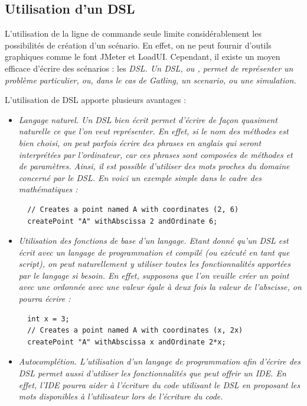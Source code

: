\subsection{Utilisation d'un DSL}
L'utilisation de la ligne de commande seule limite considérablement les possibilités de création d'un scénario. En effet, on ne peut fournir d'outils graphiques comme le font JMeter et LoadUI. Cependant, il existe un moyen efficace d'écrire des scénarios : les \em{DSL}. Un DSL, ou , permet de représenter un problème particulier, ou, dans le cas de Gatling, un scenario, ou une simulation.

L'utilisation de DSL apporte plusieurs avantages :
\begin{itemize}
  \item \em{Langage naturel}. Un DSL bien écrit permet d'écrire de façon quasiment naturelle ce que l'on veut représenter. En effet, si le nom des méthodes est bien choisi, on peut parfois écrire des phrases en anglais qui seront interprétées par l'ordinateur, car ces phrases sont composées de méthodes et de paramètres. Ainsi, il est possible d'utiliser des mots proches du domaine concerné par le DSL. En voici un exemple simple dans le cadre des mathématiques :
  \begin{lstlisting}
  // Creates a point named A with coordinates (2, 6)
  createPoint "A" withAbscissa 2 andOrdinate 6;
  \end{lstlisting}
  \item \em{Utilisation des fonctions de base d'un langage}. Etant donné qu'un DSL est écrit avec un langage de programmation et compilé (ou exécuté en tant que script), on peut naturellement y utiliser toutes les fonctionnalités apportées par le langage si besoin. En effet, supposons que l'on veuille créer un point avec une ordonnée avec une valeur égale à deux fois la valeur de l'abscisse, on pourra écrire :
  \begin{lstlisting}
  int x = 3;
  // Creates a point named A with coordinates (x, 2x)
  createPoint "A" withAbscissa x andOrdinate 2*x;
  \end{lstlisting}
  \item \em{Autocomplétion}. L'utilisation d'un langage de programmation afin d'écrire des DSL permet aussi d'utiliser les fonctionnalités que peut offrir un IDE. En effet, l'IDE pourra aider à l'écriture du code utilisant le DSL en proposant les mots disponibles à l'utilisateur lors de l'écriture du code.
\end{itemize}

